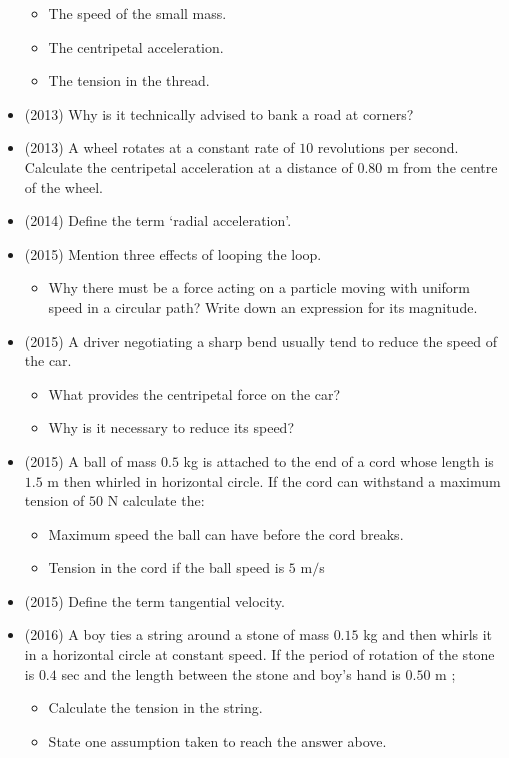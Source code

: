 \documentclass{article}
\begin{document}
\begin{itemize}
\begin{itemize}
\item The speed of the small mass.
\item The centripetal acceleration. 
\item The tension in the thread. 
\end{itemize}
\item (2013)  Why is it technically advised to bank a road at corners?
\item (2013)  A wheel rotates at a constant rate of $ 10$ revolutions per second. Calculate the centripetal acceleration at a distance of $ 0.80$ m from the centre of the wheel.
\item (2014)  Define the term ‘radial acceleration’. 
\item (2015)  Mention three effects of looping the loop.\begin{itemize}
\item Why there must be a force acting on a particle moving with uniform speed in a circular path? Write down an expression for its magnitude. 
\end{itemize}
\item (2015)  A driver negotiating a sharp bend usually tend to reduce the speed of the car.\begin{itemize}
\item  What provides the centripetal force on the car?
\item Why is it necessary to reduce its speed?
\end{itemize}
\item (2015)  A ball of mass $ 0.5$ kg is attached to the end of a cord whose length is $ 1.5$ m then whirled in horizontal circle. If the cord can withstand a maximum tension of $ 50$ N calculate the:\begin{itemize}
\item Maximum speed the ball can have before the cord breaks. 
\item Tension in the cord if the ball speed is $ 5$ m$/$s
\end{itemize}
\item (2015)  Define the term tangential velocity.
\item (2016)  A boy ties a string around a stone of mass $ 0.15$ kg and then whirls it in a horizontal circle at constant speed. If the period of rotation of the stone is $ 0.4$ sec and the length between the stone and boy’s hand is $ 0.50$ m ;\begin{itemize}
\item Calculate the tension in the string. 
\item State one assumption taken to reach the answer above.

\end{itemize}
\end{itemize}
\end{document}
